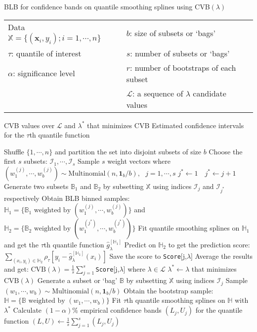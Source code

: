 \documentclass{statsoc}
\begin{document}
\begin{algorithm}[H]
\caption{BLB for confidence bands on quantile smoothing splines using  CVB$(\lambda)$}\label{fullmodel}
\begin{algorithmic}[1]
\Require \begin{tabular}{ll}
     Data $\mathbb{X}=\{(\mathbf{x}_i,y_i);i=1,\cdots,n\}$\qquad\qquad&$b$: size of subsets or `bags'\\
    $\tau$: quantile of interest&$s$: number of subsets or `bags'\\
   $\alpha$: significance level&$r$: number of bootstraps of each subset\\
   &$\mathcal{L}$: a sequence of $\lambda$ candidate values
\end{tabular}
\Ensure  CVB values over $\mathcal{L}$ and $\lambda^*$ that minimizes CVB
\Statex \qquad\;\; Estimated confidence intervals for the $\tau$th quantile function

   \State Shuffle $\{1,\cdots,n\}$ and partition the set into disjoint subsets of size $b$ 
   \State Choose the first $s$ subsets: $\mathcal{I}_1,\cdots,\mathcal{I}_s$
   \State Sample $s$ weight vectors where $(w_1^{(j)},\cdots,w_b^{(j)})\sim \text{Multinomial}(n,\mathbf{1}_b/b),\text{ }j=1,\cdots,s$
         $j^*\leftarrow 1$ 
        \Else $\text{ }j^*\leftarrow j+1$
        \EndIf
      \State Generate two subsets $\mathbb{B}_1$ and  $\mathbb{B}_2$ by subsetting $\mathbb{X}$ using indices $\mathcal{I}_j$ and $\mathcal{I}_{j^*}$ respectively
      \State Obtain BLB binned samples: 
      \Statex \; $\mathbb{H}_1=\{\mathbb{B}_1\text{ weighted by }(w_1^{(j)},\cdots,w_b^{(j)})\}$ and $\mathbb{H}_2=\{\mathbb{B}_2\text{ weighted by }(w_1^{(j^*)},\cdots,w_b^{(j^*)})\}$
        \State Fit quantile smoothing splines on $\mathbb{H}_1$ and get the $\tau$th quantile function $\hat{g}_{\lambda}^{[\mathbb{H}_1]}$
        \State Predict on $\mathbb{H}_2$ to get the prediction score: $\sum_{(x_i,y_i)\in \mathbb{H}_2} \rho_{\tau}[y_i-\hat{g}_{\lambda}^{[\mathbb{H}_1]}(x_i)]$
        \State Save the score to {\tt Score}[j,$\lambda$]
      \EndFor
   \EndFor
   \State Average the results and get: $\text{CVB}(\lambda)=\frac{1}{s}\sum_{j=1}^s${\tt Score}[j,$\lambda$] where $\lambda \in \mathcal{L}$
   \State $\lambda^*\leftarrow\lambda$ that minimizes $\text{CVB}(\lambda)$
      \State Generate a subset or `bag' $\mathbb{B}$ by subsetting $\mathbb{X}$ using indices $\mathcal{I}_j$
         \State Sample $(w_1,\cdots,w_b)\sim \text{Multinomial}(n,\mathbf{1}_b/b)$ 
         \State Obtain the bootstrap sample: $\mathbb{H}=\{\mathbb{B}\text{ weighted by }(w_1,\cdots,w_b)\}$
         \State Fit $\tau$th quantile smoothing splines on $\mathbb{H}$ with $\lambda^*$
      \EndFor
      \State Calculate $(1-\alpha)$\% empirical confidence bands $(L_j,U_j)$ for the quantile function
   \EndFor
   \State $(L,U) \leftarrow \frac{1}{s}\sum_{j=1}^s{(L_j,U_j)}$ 
\end{algorithmic}
\end{algorithm}
\end{document}

